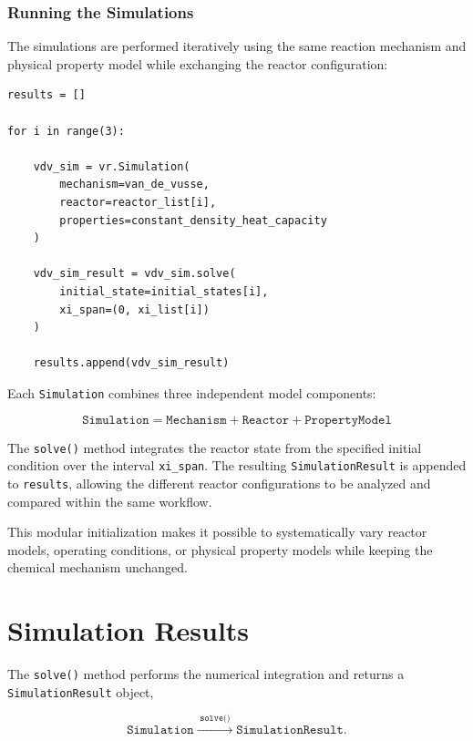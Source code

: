 \subsubsection{Running the Simulations}

The simulations are performed iteratively using the same reaction mechanism
and physical property model while exchanging the reactor configuration:

\begin{verbatim}
results = []

for i in range(3):

    vdv_sim = vr.Simulation(
        mechanism=van_de_vusse,
        reactor=reactor_list[i],
        properties=constant_density_heat_capacity
    )

    vdv_sim_result = vdv_sim.solve(
        initial_state=initial_states[i],
        xi_span=(0, xi_list[i])
    )

    results.append(vdv_sim_result)
\end{verbatim}

Each \texttt{Simulation} combines three independent model components:

\begin{equation}
    \boxed{
    \texttt{Simulation}
    =
    \texttt{Mechanism}
    +
    \texttt{Reactor}
    +
    \texttt{PropertyModel}
    }
\end{equation}

The \texttt{solve()} method integrates the reactor state from the specified
initial condition over the interval \texttt{xi\_span}. The resulting
\texttt{SimulationResult} is appended to \texttt{results}, allowing the
different reactor configurations to be analyzed and compared within the same
workflow.

This modular initialization makes it possible to systematically vary reactor
models, operating conditions, or physical property models while keeping the
chemical mechanism unchanged.


\section{Simulation Results}

The \texttt{solve()} method performs the numerical integration and returns
a \texttt{SimulationResult} object,

\begin{equation}
    \texttt{Simulation}
    \xrightarrow{\;\texttt{solve()}\;}
    \texttt{SimulationResult}.
\end{equation}

